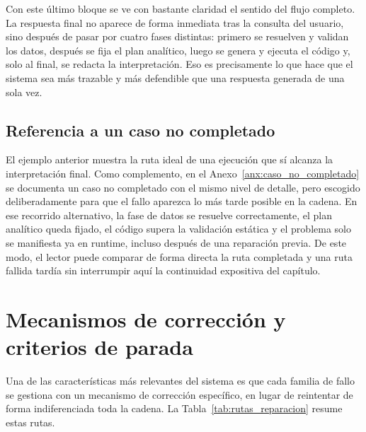 Con este \'ultimo bloque se ve con bastante claridad el sentido del flujo completo. La respuesta final no aparece de forma inmediata tras la consulta del
usuario, sino despu\'es de pasar por cuatro fases distintas: primero se resuelven y validan los datos, despu\'es se fija el plan anal\'itico, luego se
genera y ejecuta el c\'odigo y, solo al final, se redacta la interpretaci\'on. Eso es precisamente lo que hace que el sistema sea m\'as trazable y m\'as
defendible que una respuesta generada de una sola vez.

\subsection{Referencia a un caso no completado}

El ejemplo anterior muestra la ruta ideal de una ejecuci\'on que s\'i alcanza la interpretaci\'on final. Como complemento, en el
Anexo~\ref{anx:caso_no_completado} se documenta un caso no completado con el mismo nivel de detalle, pero escogido deliberadamente para que el fallo
aparezca lo m\'as tarde posible en la cadena. En ese recorrido alternativo, la fase de datos se resuelve correctamente, el plan anal\'itico queda fijado, el
c\'odigo supera la validaci\'on est\'atica y el problema solo se manifiesta ya en runtime, incluso despu\'es de una reparaci\'on previa. De este modo, el lector
puede comparar de forma directa la ruta completada y una ruta fallida tard\'ia sin interrumpir aqu\'i la continuidad expositiva del cap\'itulo.

\section{Mecanismos de correcci\'on y criterios de parada}

Una de las caracter\'isticas m\'as relevantes del sistema es que cada familia de fallo se gestiona con un mecanismo de correcci\'on espec\'ifico, en lugar de
reintentar de forma indiferenciada toda la cadena. La Tabla~\ref{tab:rutas_reparacion} resume estas rutas.


